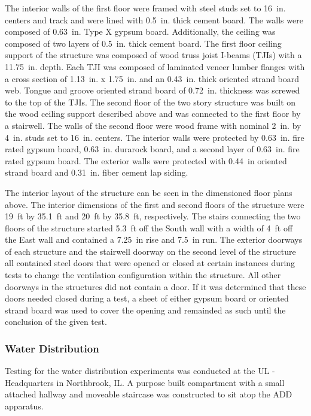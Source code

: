 \documentclass{article}
\begin{document}
The interior walls of the first floor were framed with steel studs set to 16~in. centers and track and were lined with 0.5~in. thick cement board. The walls were composed of 0.63~in. Type X gypsum board. Additionally, the ceiling was composed of two layers of 0.5~in. thick cement board. The first floor ceiling support of the structure was composed of wood truss joist I-beams (TJIs) with a 11.75~in. depth. Each TJI was composed of laminated veneer lumber flanges with a cross section of 1.13~in. x 1.75~in. and an 0.43~in. thick oriented strand board web. Tongue and groove oriented strand board of 0.72~in. thickness was screwed to the top of the TJIs. The second floor of the two story structure was built on the wood ceiling support described above and was connected to the first floor by a stairwell. The walls of the second floor were wood frame with nominal 2~in. by 4~in. studs set to 16~in. centers. The interior walls were protected by 0.63~in. fire rated gypsum board, 0.63~in. durarock board, and a second layer of 0.63~in. fire rated gypsum board. The exterior walls were protected with 0.44~in oriented strand board and 0.31~in. fiber cement lap siding.

The interior layout of the structure can be seen in the dimensioned floor plans above. The interior dimensions of the first and second floors of the structure were 19~ft by 35.1~ft and 20~ft by 35.8~ft, respectively. The stairs connecting the two floors of the structure started 5.3~ft off the South wall with a width of 4~ft off the East wall and contained a 7.25~in rise and 7.5~in run. The exterior doorways of each structure and the stairwell doorway on the second level of the structure all contained steel doors that were opened or closed at certain instances during tests to change the ventilation configuration within the structure. All other doorways in the structures did not contain a door. If it was determined that these doors needed closed during a test, a sheet of either gypsum board or oriented strand board was used to cover the opening and remainded as such until the conclusion of the given test.

\clearpage

\subsubsection{Water Distribution}

Testing for the water distribution experiments was conducted at the UL - Headquarters in Northbrook, IL. A purpose built compartment with a small attached hallway and moveable staircase was constructed to sit atop the ADD apparatus.
\end{document}
